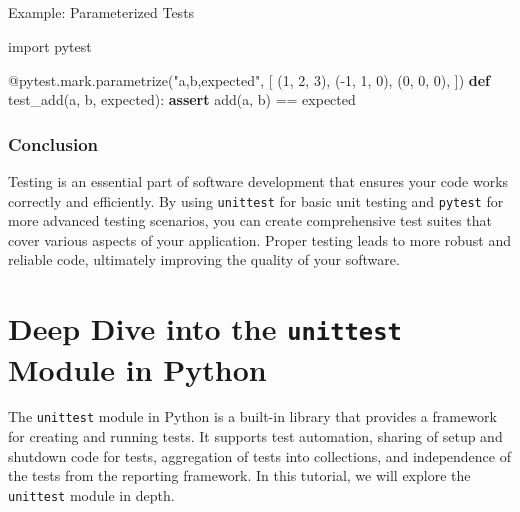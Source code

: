 \documentclass[
  letterpaper,
  DIV=11,
  numbers=noendperiod]{scrreprt}
\makeatletter
\let\oldparagraph\paragraph
\renewcommand{\paragraph}{
    \@ifstar
      \xxxParagraphStar
      \xxxParagraphNoStar
  }
\newcommand{\xxxParagraphStar}[1]{\oldparagraph*{#1}\mbox{}}
\newcommand{\xxxParagraphNoStar}[1]{\oldparagraph{#1}\mbox{}}
\newenvironment{Shaded}{\begin{snugshade}}{\end{snugshade}}
\newcommand{\AttributeTok}[1]{\textcolor[rgb]{0.40,0.45,0.13}{#1}}
\newcommand{\ControlFlowTok}[1]{\textcolor[rgb]{0.00,0.23,0.31}{\textbf{#1}}}
\newcommand{\DecValTok}[1]{\textcolor[rgb]{0.68,0.00,0.00}{#1}}
\newcommand{\ImportTok}[1]{\textcolor[rgb]{0.00,0.46,0.62}{#1}}
\newcommand{\KeywordTok}[1]{\textcolor[rgb]{0.00,0.23,0.31}{\textbf{#1}}}
\newcommand{\NormalTok}[1]{\textcolor[rgb]{0.00,0.23,0.31}{#1}}
\newcommand{\OperatorTok}[1]{\textcolor[rgb]{0.37,0.37,0.37}{#1}}
\newcommand{\StringTok}[1]{\textcolor[rgb]{0.13,0.47,0.30}{#1}}
\makeatother
\begin{document}
\paragraph{Example: Parameterized
Tests}\label{example-parameterized-tests}

\begin{Shaded}
\begin{Highlighting}[]
\ImportTok{import}\NormalTok{ pytest}

\AttributeTok{@pytest.mark.parametrize}\NormalTok{(}\StringTok{"a,b,expected"}\NormalTok{, [}
\NormalTok{    (}\DecValTok{1}\NormalTok{, }\DecValTok{2}\NormalTok{, }\DecValTok{3}\NormalTok{),}
\NormalTok{    (}\OperatorTok{{-}}\DecValTok{1}\NormalTok{, }\DecValTok{1}\NormalTok{, }\DecValTok{0}\NormalTok{),}
\NormalTok{    (}\DecValTok{0}\NormalTok{, }\DecValTok{0}\NormalTok{, }\DecValTok{0}\NormalTok{),}
\NormalTok{])}
\KeywordTok{def}\NormalTok{ test\_add(a, b, expected):}
    \ControlFlowTok{assert}\NormalTok{ add(a, b) }\OperatorTok{==}\NormalTok{ expected}
\end{Highlighting}
\end{Shaded}

\subsection{Conclusion}\label{conclusion-30}

Testing is an essential part of software development that ensures your
code works correctly and efficiently. By using \texttt{unittest} for
basic unit testing and \texttt{pytest} for more advanced testing
scenarios, you can create comprehensive test suites that cover various
aspects of your application. Proper testing leads to more robust and
reliable code, ultimately improving the quality of your software.


\chapter{\texorpdfstring{Deep Dive into the \texttt{unittest} Module in
Python}{Deep Dive into the unittest Module in Python}}\label{deep-dive-into-the-unittest-module-in-python}

The \texttt{unittest} module in Python is a built-in library that
provides a framework for creating and running tests. It supports test
automation, sharing of setup and shutdown code for tests, aggregation of
tests into collections, and independence of the tests from the reporting
framework. In this tutorial, we will explore the \texttt{unittest}
module in depth.
\end{document}
